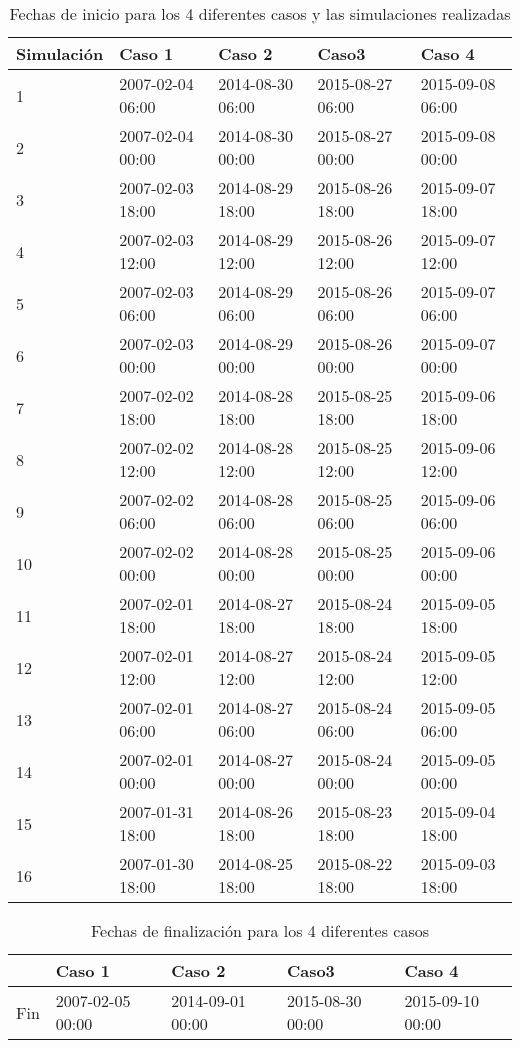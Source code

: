 \begin{table}[H]
\caption{Fechas de inicio para los 4 diferentes casos y las simulaciones realizadas}
\label{tabla_fechas_inicio}
\begin{tabular}{lllll}
 Simulación & Caso 1 & Caso 2 & Caso3 & Caso 4 \\ \hline
 1 & 2007-02-04 06:00 & 2014-08-30 06:00 & 2015-08-27  06:00 & 2015-09-08  06:00\\
 2 & 2007-02-04 00:00 & 2014-08-30 00:00 & 2015-08-27  00:00 & 2015-09-08  00:00\\
 3 & 2007-02-03 18:00 & 2014-08-29 18:00 & 2015-08-26  18:00 & 2015-09-07  18:00\\
 4 & 2007-02-03 12:00 & 2014-08-29 12:00 & 2015-08-26  12:00 & 2015-09-07  12:00\\
 5 & 2007-02-03 06:00 & 2014-08-29 06:00 & 2015-08-26  06:00 & 2015-09-07  06:00\\
 6 & 2007-02-03 00:00 & 2014-08-29 00:00 & 2015-08-26  00:00 & 2015-09-07  00:00\\
 7 & 2007-02-02 18:00 & 2014-08-28 18:00 & 2015-08-25  18:00 & 2015-09-06  18:00\\
 8 & 2007-02-02 12:00 & 2014-08-28 12:00 & 2015-08-25  12:00 & 2015-09-06  12:00\\
 9 & 2007-02-02 06:00 & 2014-08-28 06:00 & 2015-08-25  06:00 & 2015-09-06  06:00\\
10 & 2007-02-02 00:00 & 2014-08-28 00:00 & 2015-08-25  00:00 & 2015-09-06  00:00\\
11 & 2007-02-01 18:00 & 2014-08-27 18:00 & 2015-08-24  18:00 & 2015-09-05  18:00\\
12 & 2007-02-01 12:00 & 2014-08-27 12:00 & 2015-08-24  12:00 & 2015-09-05  12:00\\
13 & 2007-02-01 06:00 & 2014-08-27 06:00 & 2015-08-24  06:00 & 2015-09-05  06:00\\
14 & 2007-02-01 00:00 & 2014-08-27 00:00 & 2015-08-24  00:00 & 2015-09-05  00:00\\
15 & 2007-01-31 18:00 & 2014-08-26 18:00 & 2015-08-23  18:00 & 2015-09-04  18:00\\
16 & 2007-01-30 18:00 & 2014-08-25 18:00 & 2015-08-22  18:00 & 2015-09-03  18:00\\
\end{tabular}
\end{table}

\begin{table}[H]
\caption{Fechas de finalización para los 4 diferentes casos}
\label{tabla_fechas_finalizacion}
\begin{tabular}{lllll}
  & Caso 1 & Caso 2 & Caso3 & Caso 4 \\ \hline
 Fin & 2007-02-05 00:00 & 2014-09-01 00:00 & 2015-08-30 00:00 & 2015-09-10 00:00 \\
 
\end{tabular}
\end{table}



